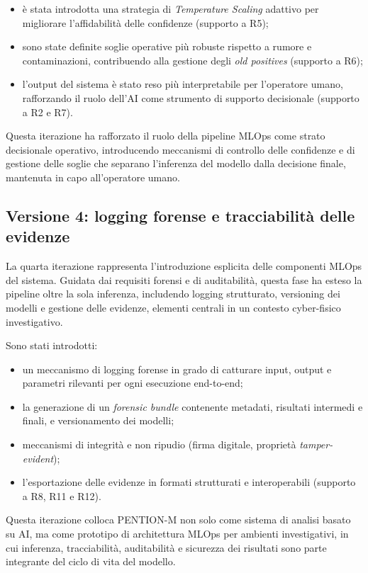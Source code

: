 \begin{itemize}
    \item è stata introdotta una strategia di \emph{Temperature Scaling} adattivo per migliorare l’affidabilità delle confidenze (supporto a R5);
    \item sono state definite soglie operative più robuste rispetto a rumore e contaminazioni, contribuendo alla gestione degli \emph{old positives} (supporto a R6);
    \item l’output del sistema è stato reso più interpretabile per l’operatore umano, rafforzando il ruolo dell’AI come strumento di supporto decisionale (supporto a R2 e R7).
\end{itemize}

Questa iterazione ha rafforzato il ruolo della pipeline MLOps come strato decisionale operativo, introducendo meccanismi di controllo delle confidenze e di gestione delle soglie che separano l’inferenza del modello dalla decisione finale, mantenuta in capo all’operatore umano.

\subsection{Versione 4: logging forense e tracciabilità delle evidenze}
\label{subsec:iter_v4}

La quarta iterazione rappresenta l’introduzione esplicita delle componenti MLOps del sistema.
Guidata dai requisiti forensi e di auditabilità, questa fase ha esteso la pipeline oltre la sola inferenza, includendo logging strutturato, versioning dei modelli e gestione delle evidenze, elementi centrali in un contesto cyber-fisico investigativo.

Sono stati introdotti:
\begin{itemize}
    \item un meccanismo di logging forense in grado di catturare input, output e parametri rilevanti per ogni esecuzione end-to-end;
    \item la generazione di un \emph{forensic bundle} contenente metadati, risultati intermedi e finali, e versionamento dei modelli;
    \item meccanismi di integrità e non ripudio (firma digitale, proprietà \emph{tamper-evident});
    \item l’esportazione delle evidenze in formati strutturati e interoperabili (supporto a R8, R11 e R12).
\end{itemize}

Questa iterazione colloca PENTION-M non solo come sistema di analisi basato su AI, ma come prototipo di architettura MLOps per ambienti investigativi, in cui inferenza, tracciabilità, auditabilità e sicurezza dei risultati sono parte integrante del ciclo di vita del modello.

